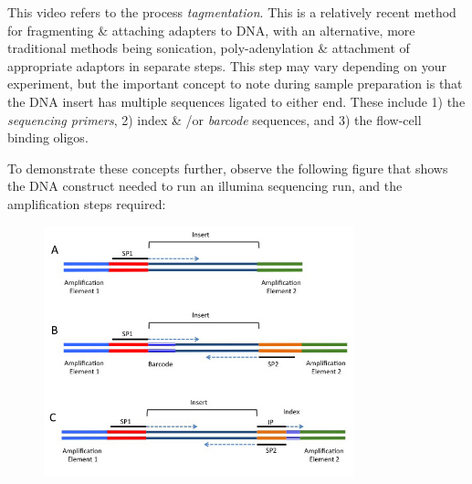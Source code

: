 \begin{note}
This video refers to the process \textit{tagmentation}.
This is a relatively recent method for fragmenting \& attaching adapters to DNA, with an alternative, more traditional methods being sonication, poly-adenylation \& attachment of appropriate adaptors in separate steps.
This step may vary depending on your experiment, but the important concept to note during sample preparation is that the DNA insert has multiple sequences ligated to either end.
These include 1) the \textit{sequencing primers}, 2) index \& /or \textit{barcode} sequences, and 3) the flow-cell binding oligos.

To demonstrate these concepts further, observe the following figure that shows the DNA construct needed to run an illumina sequencing run, and the amplification steps required:
\end{note}

\begin{figure}[h!]
  \centering
    \includegraphics[width=0.8\textwidth]{libprep.jpg}
\end{figure}



